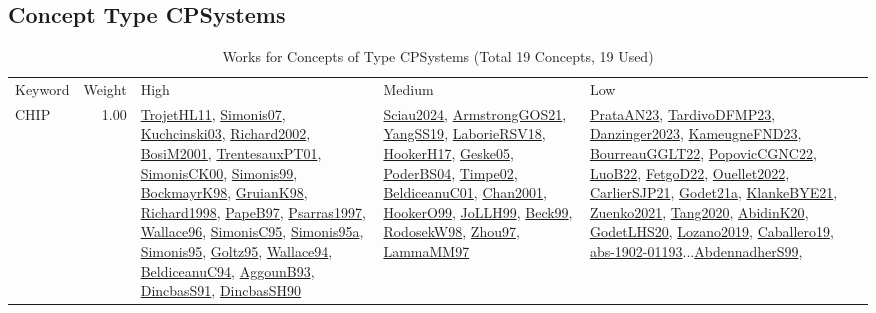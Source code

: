 \subsection{Concept Type CPSystems}
\label{sec:CPSystems}
\label{CPSystems}
{\scriptsize
\begin{longtable}{p{3cm}r>{\raggedright\arraybackslash}p{6cm}>{\raggedright\arraybackslash}p{6cm}>{\raggedright\arraybackslash}p{8cm}}
\rowcolor{white}\caption{Works for Concepts of Type CPSystems (Total 19 Concepts, 19 Used)}\\ \toprule
\rowcolor{white}Keyword & Weight & High & Medium & Low\\ \midrule\endhead
\bottomrule
\endfoot
\index{CHIP}\index{CPSystems!CHIP}CHIP &  1.00 & \hyperref[detail:TrojetHL11]{TrojetHL11}, \hyperref[detail:Simonis07]{Simonis07}, \hyperref[detail:Kuchcinski03]{Kuchcinski03}, \hyperref[detail:Richard2002]{Richard2002}, \hyperref[detail:BosiM2001]{BosiM2001}, \hyperref[detail:TrentesauxPT01]{TrentesauxPT01}, \hyperref[detail:SimonisCK00]{SimonisCK00}, \hyperref[detail:Simonis99]{Simonis99}, \hyperref[detail:BockmayrK98]{BockmayrK98}, \hyperref[detail:GruianK98]{GruianK98}, \hyperref[detail:Richard1998]{Richard1998}, \hyperref[detail:PapeB97]{PapeB97}, \hyperref[detail:Psarras1997]{Psarras1997}, \hyperref[detail:Wallace96]{Wallace96}, \hyperref[detail:SimonisC95]{SimonisC95}, \hyperref[detail:Simonis95a]{Simonis95a}, \hyperref[detail:Simonis95]{Simonis95}, \hyperref[detail:Goltz95]{Goltz95}, \hyperref[detail:Wallace94]{Wallace94}, \hyperref[detail:BeldiceanuC94]{BeldiceanuC94}, \hyperref[detail:AggounB93]{AggounB93}, \hyperref[detail:DincbasS91]{DincbasS91}, \hyperref[detail:DincbasSH90]{DincbasSH90} & \hyperref[detail:Sciau2024]{Sciau2024}, \hyperref[detail:ArmstrongGOS21]{ArmstrongGOS21}, \hyperref[detail:YangSS19]{YangSS19}, \hyperref[detail:LaborieRSV18]{LaborieRSV18}, \hyperref[detail:HookerH17]{HookerH17}, \hyperref[detail:Geske05]{Geske05}, \hyperref[detail:PoderBS04]{PoderBS04}, \hyperref[detail:Timpe02]{Timpe02}, \hyperref[detail:BeldiceanuC01]{BeldiceanuC01}, \hyperref[detail:Chan2001]{Chan2001}, \hyperref[detail:HookerO99]{HookerO99}, \hyperref[detail:JoLLH99]{JoLLH99}, \hyperref[detail:Beck99]{Beck99}, \hyperref[detail:RodosekW98]{RodosekW98}, \hyperref[detail:Zhou97]{Zhou97}, \hyperref[detail:LammaMM97]{LammaMM97} & \hyperref[detail:PrataAN23]{PrataAN23}, \hyperref[detail:TardivoDFMP23]{TardivoDFMP23}, \hyperref[detail:Danzinger2023]{Danzinger2023}, \hyperref[detail:KameugneFND23]{KameugneFND23}, \hyperref[detail:BourreauGGLT22]{BourreauGGLT22}, \hyperref[detail:PopovicCGNC22]{PopovicCGNC22}, \hyperref[detail:LuoB22]{LuoB22}, \hyperref[detail:FetgoD22]{FetgoD22}, \hyperref[detail:Ouellet2022]{Ouellet2022}, \hyperref[detail:CarlierSJP21]{CarlierSJP21}, \hyperref[detail:Godet21a]{Godet21a}, \hyperref[detail:KlankeBYE21]{KlankeBYE21}, \hyperref[detail:Zuenko2021]{Zuenko2021}, \hyperref[detail:Tang2020]{Tang2020}, \hyperref[detail:AbidinK20]{AbidinK20}, \hyperref[detail:GodetLHS20]{GodetLHS20}, \hyperref[detail:Lozano2019]{Lozano2019}, \hyperref[detail:Caballero19]{Caballero19}, \hyperref[detail:abs-1902-01193]{abs-1902-01193}...\hyperref[detail:AbdennadherS99]{AbdennadherS99}, 
\end{longtable}}
